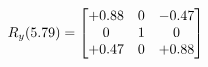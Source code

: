\documentclass[preview]{standalone}
\begin{document}
\begin{align*}
\special{dvisvgm:raw <g id='unique000'>}R_{y}(5.79) = \begin{bmatrix}+0.88 & 0 & -0.47 \\0 & 1 & 0 \\+0.47 & 0 & +0.88\end{bmatrix}\special{dvisvgm:raw </g>}
\end{align*}
\end{document}
